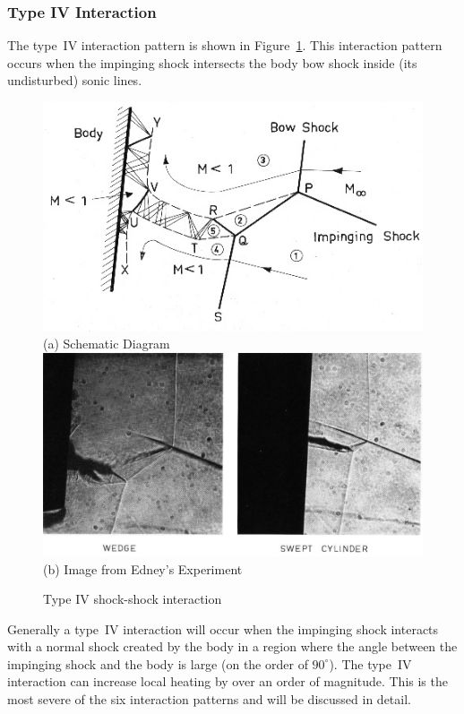 \subsubsection{Type IV Interaction}
The type~IV interaction pattern is shown in Figure~\ref{fig:type4}. This interaction pattern occurs when the impinging shock intersects the body bow shock inside (its undisturbed) sonic lines.
\begin{figure}[hbtp]
  \begin{center}
    \includegraphics[width=.95\textwidth]{figures/edney/type4_schem} \\
    (a) Schematic Diagram \\ \vspace{12pt}
    \includegraphics[width=.95\textwidth]{figures/edney/type4} \\
    (b) Image from Edney's Experiment 
    \caption[Type IV shock-shock interaction]{Type IV shock-shock interaction~\cite{edney-ssi}}
    \label{fig:type4}
  \end{center}
\end{figure}
Generally a type~IV interaction will occur when the impinging shock interacts with a normal shock created by the body in a region where the angle between the impinging shock and the body is large (on the order of $90^\circ$).   The type~IV interaction can increase local heating by over an order of magnitude.  This is the most severe of the six interaction patterns and will be discussed in detail.

